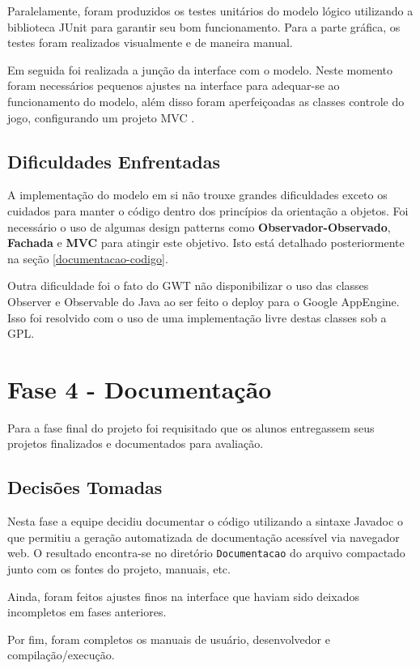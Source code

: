 \documentclass[brazil,times]{abnt}
\begin{document}
Paralelamente, foram produzidos os testes unitários do modelo lógico utilizando
a biblioteca JUnit para garantir seu bom funcionamento. Para a parte gráfica,
os testes foram realizados visualmente e de maneira manual.

Em seguida foi realizada a junção da interface com o modelo. Neste momento foram
necessários pequenos ajustes na interface para adequar-se ao funcionamento do
modelo, além disso foram aperfeiçoadas as classes controle do jogo, configurando
um projeto MVC \cite{reenskaug-mvc}.

\subsection{Dificuldades Enfrentadas}
A implementação do modelo em si não trouxe grandes dificuldades exceto os
cuidados para manter o código dentro dos princípios da orientação a objetos. Foi
necessário o uso de algumas design patterns como \textbf{Observador-Observado},
\textbf{Fachada} e \textbf{MVC} para atingir este objetivo. Isto está detalhado
posteriormente na seção \ref{documentacao-codigo}.

Outra dificuldade foi o fato do GWT não disponibilizar o uso das classes
Observer e Observable do Java ao ser feito o deploy para o Google AppEngine.
Isso foi resolvido com o uso de uma implementação livre destas classes sob a
GPL.

\section{Fase 4 - Documentação}
Para a fase final do projeto foi requisitado que os alunos entregassem seus
projetos finalizados e documentados para avaliação.

\subsection{Decisões Tomadas}
Nesta fase a equipe decidiu documentar o código utilizando a sintaxe Javadoc o
que permitiu a geração automatizada de documentação acessível via navegador web.
O resultado encontra-se no diretório \texttt{Documentacao} do arquivo compactado
junto com os fontes do projeto, manuais, etc.

Ainda, foram feitos ajustes finos na interface que haviam sido deixados
incompletos em fases anteriores.

Por fim, foram completos os manuais de usuário, desenvolvedor e
compilação/execução.
\end{document}
